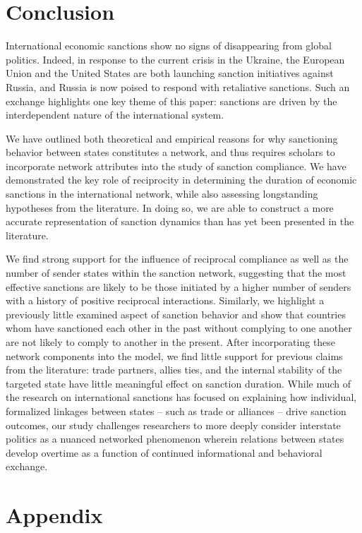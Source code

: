 \section*{Conclusion}
\label{conclusion}

International economic sanctions show no signs of disappearing from global politics. Indeed, in response to the current crisis in the Ukraine, the European Union and the United States are both launching sanction initiatives against Russia, and Russia is now poised to respond with retaliative sanctions. Such an exchange highlights one key theme of this paper: sanctions are driven by the interdependent nature of the international system. 

We have outlined both theoretical and empirical reasons for why sanctioning behavior between states constitutes a network, and thus requires scholars to incorporate network attributes into the study of sanction compliance. We have demonstrated the key role of reciprocity in determining the duration of economic sanctions in the international network, while also assessing longstanding hypotheses from the literature. In doing so, we are able to construct a more accurate representation of sanction dynamics than has yet been presented in the literature. 

We find strong support for the influence of reciprocal compliance as well as the number of sender states within the sanction network, suggesting that the most effective sanctions are likely to be those initiated by a higher number of senders with a history of positive reciprocal interactions. Similarly, we highlight a previously little examined aspect of sanction behavior and show that countries whom have sanctioned each other in the past without complying to one another are not likely to comply to another in the present. After incorporating these network components into the model, we find little support for previous claims from the literature: trade partners, allies ties, and the internal stability of the targeted state have little meaningful effect on sanction duration. While much of the research on international sanctions has focused on explaining how individual, formalized linkages between states -- such as trade or alliances -- drive sanction outcomes, our study challenges researchers to more deeply consider interstate politics as a nuanced networked phenomenon wherein relations between states develop overtime as a function of continued informational and behavioral exchange. 

\newpage
\section*{Appendix}
\label{appendix}

